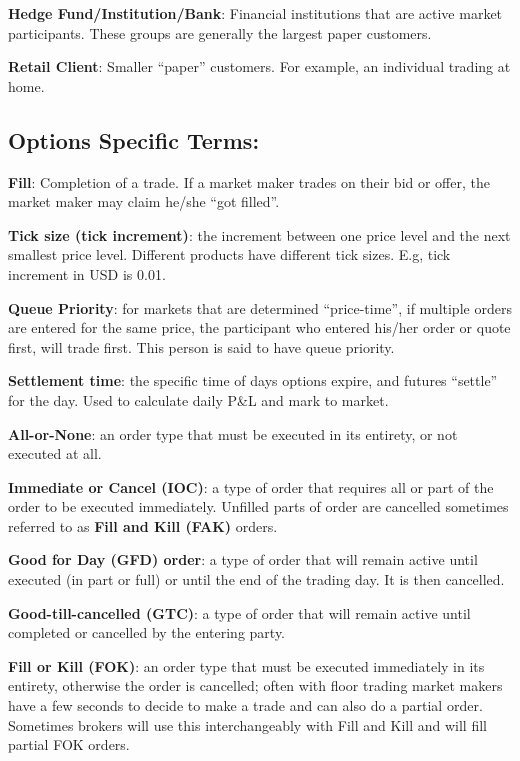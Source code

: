 \documentclass{article}
\begin{document}
\textbf{Hedge Fund/Institution/Bank}: Financial institutions that are active
market participants. These groups are generally the largest paper customers.

\textbf{Retail Client}: Smaller “paper” customers. For example, an individual
trading at home.


\subsection{Options Specific Terms:}

\textbf{Fill}: Completion of a trade. If a market maker trades on their bid or offer,
the market maker may claim he/she “got filled”.

\textbf{Tick size (tick increment)}: the increment between one price level 
and the next smallest price level. Different products have different tick
sizes. E.g, tick increment in USD is 0.01.

\textbf{Queue Priority}: for markets that are determined “price-time”,
if multiple orders are entered for the same price, the participant
who entered his/her order or quote first, will trade first.
This person is said to have queue priority.

\textbf{Settlement time}: the specific time of days options expire,
and futures “settle” for the day. Used to calculate daily
P\&L and mark to market.

\textbf{All-or-None}: an order type that must be executed in its entirety,
or not executed at all.

\textbf{Immediate or Cancel (IOC)}: a type of order that requires all or part
of the order to be executed immediately. Unfilled parts of order are cancelled
sometimes referred to as \textbf{Fill and Kill (FAK)} orders.

\textbf{Good for Day (GFD) order}: a type of order that will remain active until
executed (in part or full) or until the end of the trading day.
It is then cancelled.

\textbf{Good-till-cancelled (GTC)}: a type of order that will remain active until
completed or cancelled by the entering party.

\textbf{Fill or Kill (FOK)}: an order type that must be executed immediately
in its entirety, otherwise the order is cancelled; often with floor trading
market makers have a few seconds to decide to make a trade and can also do a
partial order. Sometimes brokers will use this interchangeably with Fill and Kill
and will fill partial FOK orders.
\end{document}
